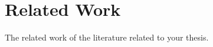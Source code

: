 \section{Related Work}
\label{sec:relatedWork}

The related work of the literature related to your thesis.